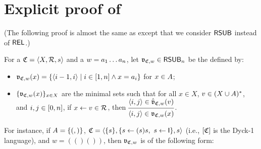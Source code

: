 \section{Explicit proof of }\label{section: proofs in undecidability}
(The following proof is almost the same as \cite[Section VI]{nakamuraExistentialCalculiRelations2023} except that we consider $\mathsf{RSUB}$ instead of $\mathsf{REL}$.)

For a  $\mathfrak{C} = \langle X, \mathcal{R}, s\rangle$ and a  $\word = a_1 \dots a_n$,
let $\val_{\CFG, \word} \in \RSUB_{n}$ be the  defined by:
\begin{itemize}
    \item $\val_{\CFG, \word}(x) = \set{\tuple{i-1, i} \mid i \in \range{1, n} \land x = a_i}$ for $x \in A$;
    \item $\set{\val_{\CFG, \word}(x)}_{x \in X}$ are the minimal sets such that
          for all $x \in X$, $\word[2] \in (X \cup \CSIG)^*$, and $i, j \in [0, n]$, if $x \leftarrow \word[2] \in \mathcal{R}$, then
          $\begin{prooftree}
                  \hypo{\tuple{i,j} \in \hat{\val}_{\CFG, \word}(\word[2])}
                  \infer1{\tuple{i,j} \in \val_{\CFG, \word}(x)}
              \end{prooftree}$.
\end{itemize}
For instance, if $A = \{(,)\}$,
$\mathfrak{C} = \langle\{s\}, \{s \leftarrow (s) s,\  s \leftarrow \mathsf{I}\}, s\rangle$ (i.e., $[ \mathfrak{C} ]$ is the Dyck-1 language), and $w = (()())$, then $\val_{\CFG, \word}$ is of the following form:
